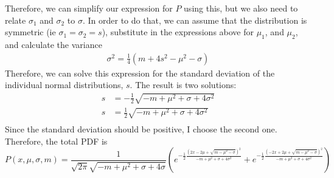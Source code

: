 \documentclass{article}
\begin{document}
Therefore, we can simplify our expression for $P$ using this, but we also need to relate $\sigma_1$ and $\sigma_2$ to $\sigma$.  In order to do that, we can assume that the distribution is symmetric (ie $\sigma_1=\sigma_2=s$), substitute in the expressions above for $\mu_1$, and $\mu_2$, and calculate the variance 
\begin{align}
\sigma^2 = \frac{1}{4}\left(m+4s^2-\mu^2-\sigma \right)
\end{align}
Therefore, we can solve this expression for the standard deviation of the individual normal distributions, $s$.  The result is two solutions:
\begin{align}
s & = -\frac{1}{2}\sqrt{-m + \mu^2 + \sigma + 4\sigma^2}\\
s & = \frac{1}{2}\sqrt{-m + \mu^2 + \sigma + 4\sigma^2}\\
\end{align}
Since the standard deviation should be positive, I choose the second one.  Therefore, the total PDF is
\begin{equation}
P(x,\mu,\sigma,m) = \frac{1}{\sqrt{2 \pi}\sqrt{-m+\mu^2+\sigma + 4\sigma}}\left( 
e^{
	-\frac{1}{2}
	\frac{\left(2x-2\mu+\sqrt{m-\mu^2-\sigma}\right)^2}
	{-m+\mu^2+\sigma+4\sigma^2}}+ 
e^{
	-\frac{1}{2}
	\frac{\left(-2x+2\mu+\sqrt{m-\mu^2-\sigma}\right)^2}
	{-m+\mu^2+\sigma+4\sigma^2}}\right)
\end{equation}
\end{document}
